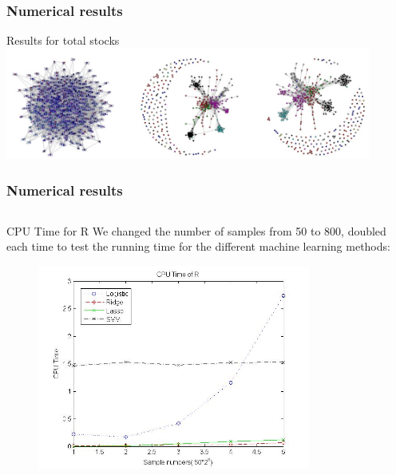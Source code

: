 \documentclass{beamer}
\begin{document}
\begin{frame}
\frametitle{Numerical results}
\begin{block}{Results for total stocks}
     \includegraphics[width=0.9\textwidth, height=0.4\textheight]{stock.jpg}
\end{block}
\end{frame}

\begin{frame}
\frametitle{Numerical results}
\begin{columns}
\column{2.3in}
	\begin{block}{CPU Time for R}
We changed the number of samples from 50 to 800, doubled each time to test the running time for the different machine learning methods:\\
\begin{figure}
     \includegraphics[width=0.8\textwidth, height=0.5\textheight]{cputime_r.jpg}

    \end{figure}

\end{block}


\end{columns}
\end{frame}
\end{document}
